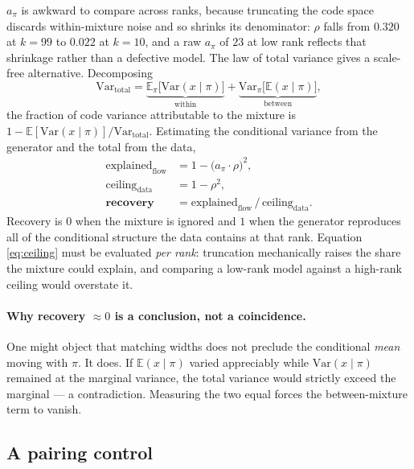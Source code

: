 $a_\pi$ is awkward to compare across ranks, because truncating the code space
discards within-mixture noise and so shrinks its denominator: $\rho$ falls from
$0.320$ at $k{=}99$ to $0.022$ at $k{=}10$, and a raw $a_\pi$ of $23$ at low rank
reflects that shrinkage rather than a defective model. The law of total variance
gives a scale-free alternative. Decomposing
%
\begin{equation}
\mathrm{Var}_{\text{total}}
= \underbrace{\mathbb{E}_\pi\big[\mathrm{Var}(x \mid \pi)\big]}_{\text{within}}
+ \underbrace{\mathrm{Var}_\pi\big[\mathbb{E}(x \mid \pi)\big]}_{\text{between}} ,
\end{equation}
%
the fraction of code variance attributable to the mixture is
$1 - \mathbb{E}[\mathrm{Var}(x\mid\pi)]/\mathrm{Var}_{\text{total}}$. Estimating the
conditional variance from the generator and the total from the data,
%
\begin{align}
\text{explained}_{\text{flow}} &= 1 - \big(a_\pi \cdot \rho\big)^2, \label{eq:flowvar}\\
\text{ceiling}_{\text{data}}   &= 1 - \rho^2, \label{eq:ceiling}\\
\textbf{recovery} &= \text{explained}_{\text{flow}} \,/\, \text{ceiling}_{\text{data}} .
\label{eq:recovery}
\end{align}
%
Recovery is $0$ when the mixture is ignored and $1$ when the generator reproduces all
of the conditional structure the data contains at that rank. Equation
\eqref{eq:ceiling} must be evaluated \emph{per rank}: truncation mechanically raises
the share the mixture could explain, and comparing a low-rank model against a
high-rank ceiling would overstate it.

\paragraph{Why recovery $\approx 0$ is a conclusion, not a coincidence.}
One might object that matching widths does not preclude the conditional \emph{mean}
moving with $\pi$. It does. If $\mathbb{E}(x \mid \pi)$ varied appreciably while
$\mathrm{Var}(x \mid \pi)$ remained at the marginal variance, the total variance would
strictly exceed the marginal --- a contradiction. Measuring the two equal forces the
between-mixture term to vanish.

\subsection{A pairing control}
\label{app:pairing}


